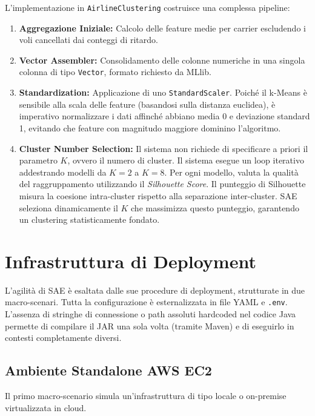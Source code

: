 \documentclass[conference]{IEEEtran}
\begin{document}
L'implementazione in \texttt{AirlineClustering} costruisce una complessa pipeline:
\begin{enumerate}
    \item \textbf{Aggregazione Iniziale:} Calcolo delle feature medie per carrier escludendo i voli cancellati dai conteggi di ritardo.
    \item \textbf{Vector Assembler:} Consolidamento delle colonne numeriche in una singola colonna di tipo \texttt{Vector}, formato richiesto da MLlib.
    \item \textbf{Standardization:} Applicazione di uno \texttt{StandardScaler}.
    Poiché il k-Means è sensibile alla scala delle feature (basandosi sulla distanza euclidea), è imperativo normalizzare i dati affinché abbiano media 0 e deviazione standard 1, evitando che feature con magnitudo maggiore dominino l'algoritmo.
    \item \textbf{Cluster Number Selection:} Il sistema non richiede di specificare a priori il parametro $K$, ovvero il numero di cluster.
    Il sistema esegue un loop iterativo addestrando modelli da $K=2$ a $K=8$.
    Per ogni modello, valuta la qualità del raggruppamento utilizzando il \textit{Silhouette Score}.
    Il punteggio di Silhouette misura la coesione intra-cluster rispetto alla separazione inter-cluster.
    SAE seleziona dinamicamente il $K$ che massimizza questo punteggio, garantendo un clustering statisticamente fondato.
\end{enumerate}


\section{Infrastruttura di Deployment}\label{sec:deployment_infrastructure}
L'agilità di SAE è esaltata dalle sue procedure di deployment, strutturate in due macro-scenari.
Tutta la configurazione è esternalizzata in file YAML e \texttt{.env}.
L'assenza di stringhe di connessione o path assoluti hardcoded nel codice Java permette di compilare il JAR una sola volta (tramite Maven) e di eseguirlo in contesti completamente diversi.

\subsection{Ambiente Standalone AWS EC2}
Il primo macro-scenario simula un'infrastruttura di tipo locale o on-premise virtualizzata in cloud.
\end{document}
